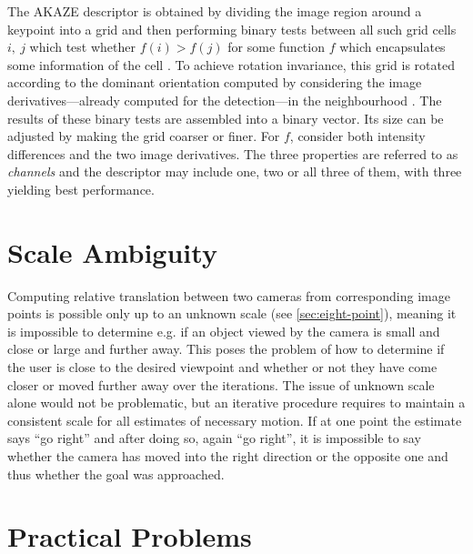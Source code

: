 The AKAZE descriptor is obtained by dividing the image region around a
keypoint into a grid and then performing binary tests between all such grid
cells $i,~j$ which test whether $f(i) > f(j)$ for some function $f$ which
encapsulates some information of the cell \citep{yang2012}. To achieve rotation
invariance, this grid is rotated according to the dominant orientation computed
by considering the image derivatives---already computed for the detection---in
the neighbourhood \citep{alcantarilla2012}. The results of these binary tests are
assembled into a binary vector. Its size can be adjusted by making the grid
coarser or finer. For $f$, \citet{alcantarilla2012} consider both intensity
differences and the two image derivatives. The three properties are referred to as
\emph{channels} and the descriptor may include one, two or all three of them,
with three yielding best performance.

\section{Scale Ambiguity}

Computing relative translation between two cameras from corresponding image
points is possible only up to an unknown scale (see \autoref{sec:eight-point}),
meaning it is impossible to determine e.g. if an object viewed by the camera is
small and close or large and further away.  This poses the problem of how to
determine if the user is close to the desired viewpoint and whether or not they
have come closer or moved further away over the iterations.  The issue of
unknown scale alone would not be problematic, but an iterative procedure
requires to maintain a consistent scale for all estimates of necessary motion.
If at one point the estimate says ``go right'' and after doing so, again ``go
right'', it is impossible to say whether the camera has moved into the right
direction or the opposite one and thus whether the goal was approached.

\section{Practical Problems}
\label{sec:app_challenges}

